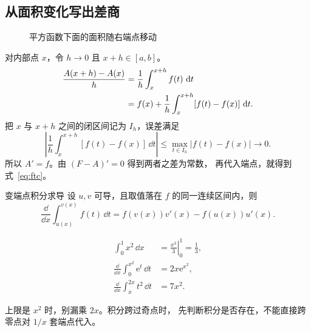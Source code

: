 \subsection{从面积变化写出差商}
\begin{figure}[htbp]
\centering
{}
\caption{平方函数下面的面积随右端点移动}\label{fig:area}
\end{figure}

对内部点 \(x\)，令 \(h\to0\) 且 \(x+h\in[a,b]\)。
\begin{align}
  \frac{A(x+h)-A(x)}{h}
    &=\frac{1}{h}\int_x^{x+h}f(t)\,\mathop{}\!\mathrm{d} t \notag\\
    &=f(x)+\frac{1}{h}\int_x^{x+h}[f(t)-f(x)]\,\mathop{}\!\mathrm{d} t.
\end{align}
把 \(x\) 与 \(x+h\) 之间的闭区间记为 \(I_h\)，误差满足
\[
  \left|\frac{1}{h}\int_x^{x+h}[f(t)-f(x)]\,\dd t\right|
  \leq\max_{t\in I_h}|f(t)-f(x)|\longrightarrow0.
\]
所以 \(A'=f\)。由 \((F-A)'=0\) 得到两者之差为常数，
再代入端点，就得到式~\eqref{eq:ftc}。

\begin{methodbox}{变端点积分求导}
设 \(u,v\) 可导，且取值落在 \(f\) 的同一连续区间内，则
\[
  \frac{\dd}{\dd x}\int_{u(x)}^{v(x)}f(t)\,\dd t
  =f(v(x))v'(x)-f(u(x))u'(x).
\]
\end{methodbox}
\begin{align*}
  \int_0^1x^2\,\dd x&=\left.\frac{x^3}{3}\right|_0^1=\frac13,\\
  \frac{\dd}{\dd x}\int_0^{x^2}\mathrm{e}^t\,\dd t&=2x\mathrm{e}^{x^2},\\
  \frac{\dd}{\dd x}\int_x^{2x}t^2\,\dd t&=7x^2.
\end{align*}
\begin{pitfallbox}
上限是 \(x^2\) 时，别漏乘 \(2x\)。积分跨过奇点时，
先判断积分是否存在，不能直接跨零点对 \(1/x\) 套端点代入。
\end{pitfallbox}

